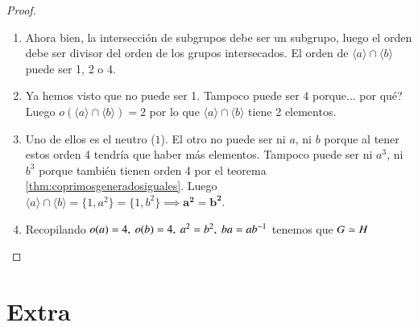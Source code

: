 \begin{proof}
\begin{enumerate}
\begin{itemize}
\begin{enumerate}
				\item Ahora bien, la intersección de subgrupos debe ser un subgrupo, luego el orden debe ser divisor del orden de los grupos intersecados. El orden de $\langle a \rangle \cap \langle b \rangle$ puede ser 1, 2 o 4.
				\item Ya hemos visto que no puede ser 1. Tampoco puede ser 4 porque... por qué? Luego $o(\langle a \rangle \cap \langle b \rangle) = 2$ por lo que $\langle a \rangle \cap \langle b \rangle$ tiene 2 elementos.
				\item Uno de ellos es el neutro ($1$). El otro no puede ser ni $a$, ni $b$ porque al tener estos orden 4 tendría que haber más elementos. Tampoco puede ser ni $a^3$, ni $b^3$ porque también tienen orden 4 por el teorema \ref{thm:coprimosgeneradosiguales}. Luego $\langle a \rangle \cap \langle b \rangle = \{1, a^2\} = \{1, b^2\} \implies \mathbf{a^2 = b^2}$.
				\item Recopilando $o(a) = 4,\ o(b) = 4,\ a^2 = b^2,\ ba = ab^{-1}$ tenemos que $G \simeq H \qedhere$
			\end{enumerate}
		\end{itemize}
	\end{enumerate}
\end{proof}

\section{Extra}

